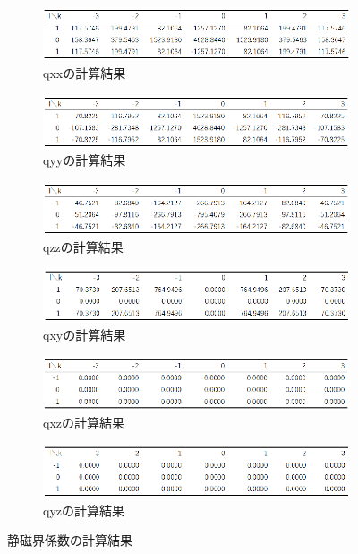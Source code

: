 \documentclass{jsarticle}
\begin{document}
\begin{figure}[H]
	\centering
	\begin{subfigure}{0.7\columnwidth}
		\centering
		\includegraphics[width=\columnwidth]{tab01_1.eps}
		\caption{qxxの計算結果}
		\label{tab01_1}
	\end{subfigure}
	\begin{subfigure}{0.7\columnwidth}
		\centering
		\includegraphics[width=\columnwidth]{tab01_2.eps}
		\caption{qyyの計算結果}
		\label{tab01_2}
	\end{subfigure}
	\begin{subfigure}{0.7\columnwidth}
		\centering
		\includegraphics[width=\columnwidth]{tab01_3.eps}
		\caption{qzzの計算結果}
		\label{tab01_3}
	\end{subfigure}
	\begin{subfigure}{0.7\columnwidth}
		\centering
		\includegraphics[width=\columnwidth]{tab01_4.eps}
		\caption{qxyの計算結果}
		\label{tab01_4}
	\end{subfigure}
	\begin{subfigure}{0.7\columnwidth}
		\centering
		\includegraphics[width=\columnwidth]{tab01_5.eps}
		\caption{qxzの計算結果}
		\label{tab01_5}
	\end{subfigure}
	\begin{subfigure}{0.7\columnwidth}
		\centering
		\includegraphics[width=\columnwidth]{tab01_6.eps}
		\caption{qyzの計算結果}
		\label{tab01_6}
	\end{subfigure}
	\caption{静磁界係数の計算結果}
	\label{tab01}
\end{figure}
\end{document}
